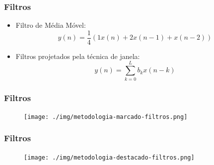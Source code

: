 \documentclass[brazil]{beamer}
\begin{document}
\begin{frame}
\frametitle{Filtros}
      \begin{itemize}
      	\item Filtro de Média Móvel:
      	\begin{equation}
      		y(n) = \frac{1}{4}(1 x(n) + 2 x(n-1) + x(n-2))
      	\end{equation}
      	
      		
      	\item Filtros projetados pela técnica de janela:
      	\begin{equation}
      		y(n) = \sum_{k=0}^L b_k x(n-k)
      	\end{equation}

      	
  \end{itemize} 
\end{frame}

\begin{frame}
\frametitle{Filtros}
        \begin{figure}
            \centering
            \texttt{[image: ./img/metodologia-marcado-filtros.png]}
      \end{figure}
\end{frame}

\begin{frame}
\frametitle{Filtros}      

 \begin{figure}
            \centering
            \texttt{[image: ./img/metodologia-destacado-filtros.png]}
      \end{figure}
\end{frame}
\end{document}
